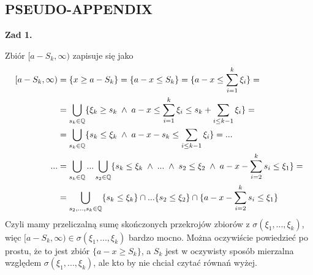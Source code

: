 \documentclass{article}
\begin{document}
\subsection*{PSEUDO-APPENDIX}

\textbf{\large Zad 1.}

Zbiór $[a-S_k, \infty)$ zapisuje się jako
\begin{align*}
   [a-S_k, \infty)&=\{x\geq a-S_k\}=\{a-x\leq S_k\}=\{a-x\leq \sum_{i=1}^k\xi_i\}=\\ 
                          &=\bigcup_{s_k\in\operatorname{\mathbb{Q}} }\{\xi_k\geq s_k\;\land\;a-x\leq \sum_{i=1}^k\xi_i\leq s_k+\sum_{i\leq k-1}\xi_i\}=\\ 
                          &=\bigcup_{s_k\in\operatorname{\mathbb{Q}}}\{s_k\leq \xi_k\;\land\;a-x-s_k\leq \sum_{i\leq k-1}\xi_i\}=...\\ 
     ...&=\bigcup_{s_k\in\operatorname{\mathbb{Q}}}...\bigcup_{s_2\in\operatorname{\mathbb{Q}}}\{s_k\leq \xi_k\;\land\;...\;\land\; s_2\leq \xi_2\;\land\; a-x-\sum_{i=2}^ks_i\leq \xi_1 \}=\\ 
        &=\bigcup_{s_2,...,s_k\in\operatorname{\mathbb{Q}}}\{s_k\leq \xi_k\}\cap ...\{s_2\leq \xi_2\}\cap\{a-x-\sum_{i=2}^ks_i\leq \xi_1\}
\end{align*}
Czyli mamy przeliczalną sumę skończonych przekrojów zbiorów z $\sigma(\xi_1,...,\xi_k)$, więc $[a-S_k, \infty)\in\sigma(\xi_1,...,\xi_k)$ bardzo mocno. Można oczywiście powiedzieć po prostu, że to jest zbiór $\{a-x\geq S_k\}$, a $S_k$ jest w oczywisty sposób mierzalna względem $\sigma(\xi_1,...,\xi_k)$, ale kto by nie chciał czytać równań wyżej.

\end{document}
